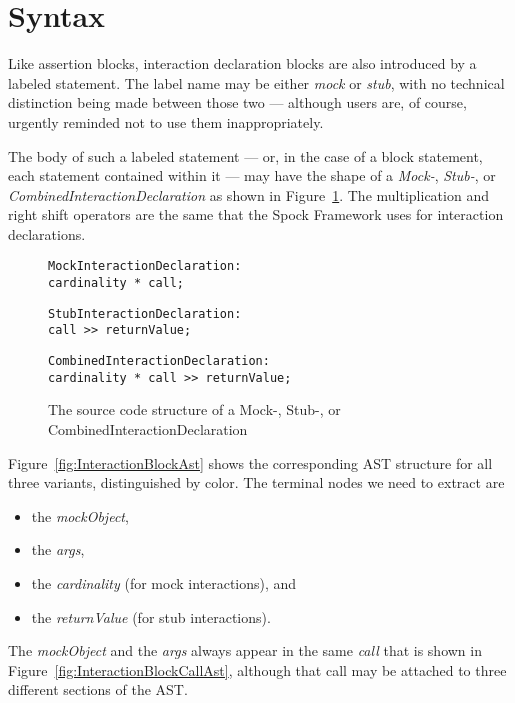 \section{Syntax}
Like assertion blocks, interaction declaration blocks are also introduced by a labeled statement.
The label name may be either \textit{mock} or \textit{stub},
with no technical distinction being made between those two ---
although users are, of course, urgently reminded not to use them inappropriately.

The body of such a labeled statement
--- or, in the case of a block statement, each statement contained within it ---
may have the shape of a \textit{Mock-}, \textit{Stub-}, or \textit{CombinedInteractionDeclaration}
as shown in Figure~\ref{fig:InteractionBlockVariants}.
The multiplication and right shift operators are the same
that the Spock Framework uses for interaction declarations.

\begin{figure}
  {\color{teal}
    \begin{verbatim}
MockInteractionDeclaration:
cardinality * call;
    \end{verbatim}
  }
  {\color{magenta}
    \begin{verbatim}
StubInteractionDeclaration:
call >> returnValue;
    \end{verbatim}
  }
  {\color{violet}
    \begin{verbatim}
CombinedInteractionDeclaration:
cardinality * call >> returnValue;
    \end{verbatim}
  }
  \caption{
    The source code structure of a Mock-, Stub-, or CombinedInteractionDeclaration
  }\label{fig:InteractionBlockVariants}
\end{figure}

Figure~\ref{fig:InteractionBlockAst} shows the corresponding AST structure
for all three variants, distinguished by color.
The terminal nodes we need to extract are
\begin{itemize}
  \item the \textit{mockObject},
  \item the \textit{args},
  \item the \textit{cardinality} (for mock interactions), and
  \item the \textit{returnValue} (for stub interactions).
\end{itemize}
The \textit{mockObject} and the \textit{args} always appear
in the same  \textit{call}
that is shown in Figure~\ref{fig:InteractionBlockCallAst},
although that call may be attached to three different sections of the AST.

